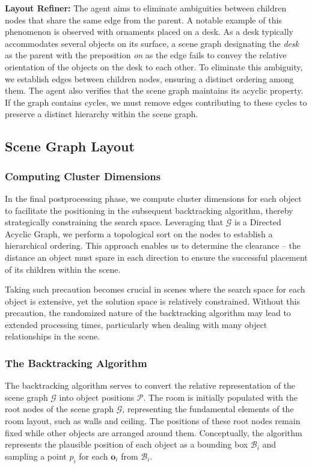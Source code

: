 \documentclass[runningheads]{llncs}
\begin{document}
\textbf{Layout Refiner:} 
The agent aims to eliminate ambiguities between children nodes that share the same edge from the parent. A notable example of this phenomenon is observed with ornaments placed on a desk. As a desk typically accommodates several objects on its surface, a scene graph designating the \textit{desk} as the parent with the preposition \textit{on} as the edge fails to convey the relative orientation of the objects on the desk to each other. To eliminate this ambiguity, we establish edges between children nodes, ensuring a distinct ordering among them. 
The agent also verifies that the scene graph maintains its acyclic property. If the graph contains cycles, we must remove edges contributing to these cycles to preserve a distinct hierarchy within the scene graph.

\subsection{Scene Graph Layout}
\label{sec:scene_graph_gen}

\subsubsection{Computing Cluster Dimensions} 
\label{cluster_sizes}

In the final postprocessing phase, we compute cluster dimensions for each object to facilitate the positioning in the subsequent backtracking algorithm, thereby strategically constraining the search space. Leveraging that \(\mathcal{G}\) is a Directed Acyclic Graph, we perform a topological sort on the nodes to establish a hierarchical ordering. This approach enables us to determine the clearance -- the distance an object must spare in each direction to ensure the successful placement of its children within the scene.

Taking such precaution becomes crucial in scenes where the search space for each object is extensive, yet the solution space is relatively constrained. Without this precaution, the randomized nature of the backtracking algorithm may lead to extended processing times, particularly when dealing with many object relationships in the scene.

\subsubsection{The Backtracking Algorithm} 
\label{backtracking}

The backtracking algorithm serves to convert the relative representation of the scene graph \(\mathcal{G}\) into object positions \(\mathcal{P}\). The room is initially populated with the root nodes of the scene graph \(\mathcal{G}\), representing the fundamental elements of the room layout, such as walls and ceiling. The positions of these root nodes remain fixed while other objects are arranged around them. 
Conceptually, the algorithm represents the plausible position of each object as a bounding box \(\mathcal{B}_i\) and sampling a point \(p_i\) for each \(\mathbf{o}_i\) from \(\mathcal{B}_i\).
\end{document}
